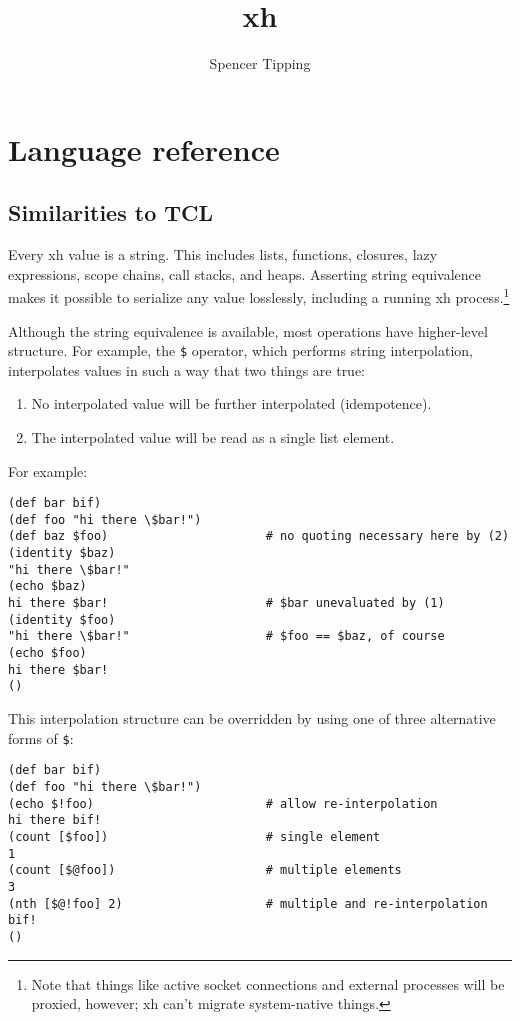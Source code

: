 \documentclass{report}
\title{xh}
\author{Spencer Tipping}
\begin{document}
\maketitle{}
\tableofcontents{}


\part{Language reference}\label{part:language-reference}
\chapter{Similarities to TCL}\label{chp:similarities-to-tcl}
  Every xh value is a string. This includes lists, functions, closures, lazy
  expressions, scope chains, call stacks, and heaps. Asserting string
  equivalence makes it possible to serialize any value losslessly, including a
  running xh process.\footnote{Note that things like active socket connections
  and external processes will be proxied, however; xh can't migrate
  system-native things.}

  Although the string equivalence is available, most operations have
  higher-level structure. For example, the \verb|$| operator, which performs
  string interpolation, interpolates values in such a way that two things are
  true:

\begin{enumerate}
\item{No interpolated value will be further interpolated (idempotence).}
       \label{item:interpolation-idempotence}
\item{The interpolated value will be read as a single list element.}
       \label{item:interpolation-singularity}
\end{enumerate}

  For example:

\begin{verbatim}
(def bar bif)
(def foo "hi there \$bar!")
(def baz $foo)                      # no quoting necessary here by (2)
(identity $baz)
"hi there \$bar!"
(echo $baz)
hi there $bar!                      # $bar unevaluated by (1)
(identity $foo)
"hi there \$bar!"                   # $foo == $baz, of course
(echo $foo)
hi there $bar!
()
\end{verbatim}

  This interpolation structure can be overridden by using one of three
  alternative forms of \verb|$|:

\begin{verbatim}
(def bar bif)
(def foo "hi there \$bar!")
(echo $!foo)                        # allow re-interpolation
hi there bif!
(count [$foo])                      # single element
1
(count [$@foo])                     # multiple elements
3
(nth [$@!foo] 2)                    # multiple and re-interpolation
bif!
()
\end{verbatim}
\end{document}
